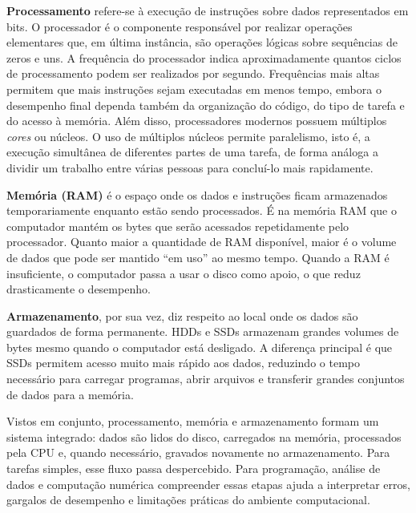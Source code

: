 \documentclass[
  brazilian,
  letterpaper,
  DIV=11,
  numbers=noendperiod]{scrreprt}
\begin{document}
\textbf{Processamento} refere-se à execução de instruções sobre dados
representados em bits. O processador é o componente responsável por
realizar operações elementares que, em última instância, são operações
lógicas sobre sequências de zeros e uns. A frequência do processador
indica aproximadamente quantos ciclos de processamento podem ser
realizados por segundo. Frequências mais altas permitem que mais
instruções sejam executadas em menos tempo, embora o desempenho final
dependa também da organização do código, do tipo de tarefa e do acesso à
memória. Além disso, processadores modernos possuem múltiplos
\emph{cores} ou núcleos. O uso de múltiplos núcleos permite paralelismo,
isto é, a execução simultânea de diferentes partes de uma tarefa, de
forma análoga a dividir um trabalho entre várias pessoas para concluí-lo
mais rapidamente.

\textbf{Memória (RAM)} é o espaço onde os dados e instruções ficam
armazenados temporariamente enquanto estão sendo processados. É na
memória RAM que o computador mantém os bytes que serão acessados
repetidamente pelo processador. Quanto maior a quantidade de RAM
disponível, maior é o volume de dados que pode ser mantido ``em uso'' ao
mesmo tempo. Quando a RAM é insuficiente, o computador passa a usar o
disco como apoio, o que reduz drasticamente o desempenho.

\textbf{Armazenamento}, por sua vez, diz respeito ao local onde os dados
são guardados de forma permanente. HDDs e SSDs armazenam grandes volumes
de bytes mesmo quando o computador está desligado. A diferença principal
é que SSDs permitem acesso muito mais rápido aos dados, reduzindo o
tempo necessário para carregar programas, abrir arquivos e transferir
grandes conjuntos de dados para a memória.

Vistos em conjunto, processamento, memória e armazenamento formam um
sistema integrado: dados são lidos do disco, carregados na memória,
processados pela CPU e, quando necessário, gravados novamente no
armazenamento. Para tarefas simples, esse fluxo passa despercebido. Para
programação, análise de dados e computação numérica compreender essas
etapas ajuda a interpretar erros, gargalos de desempenho e limitações
práticas do ambiente computacional.
\end{document}
